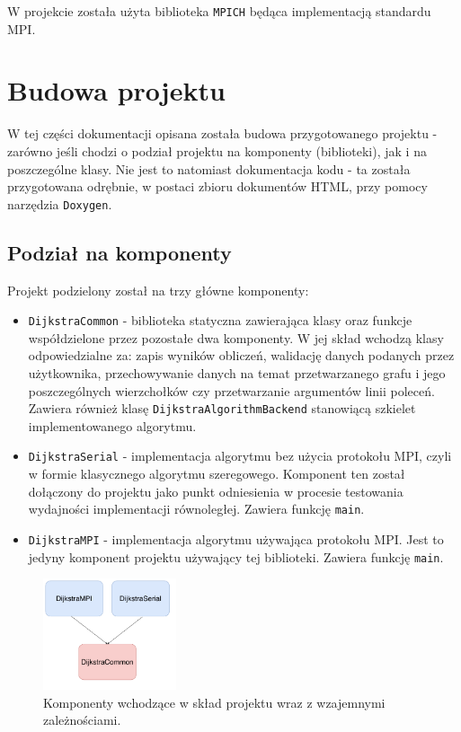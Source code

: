\documentclass[12pt]{article}
\begin{document}
W projekcie została użyta biblioteka \lstinline|MPICH| będąca implementacją standardu MPI.

\newpage
\section{Budowa projektu}
W tej części dokumentacji opisana została budowa przygotowanego projektu - zarówno jeśli chodzi o podział projektu na komponenty (biblioteki), jak i na poszczególne klasy. Nie jest to natomiast dokumentacja kodu - ta została przygotowana odrębnie, w postaci zbioru dokumentów HTML, przy pomocy narzędzia \lstinline{Doxygen}.

\subsection{Podział na komponenty}
Projekt podzielony został na trzy główne komponenty:
\begin{itemize}
\item \lstinline{DijkstraCommon} - biblioteka statyczna zawierająca klasy oraz funkcje współdzielone przez pozostałe dwa komponenty. W jej skład wchodzą klasy odpowiedzialne za: zapis wyników obliczeń, walidację danych podanych przez użytkownika, przechowywanie danych na temat przetwarzanego grafu i jego poszczególnych wierzchołków czy przetwarzanie argumentów linii poleceń. Zawiera również klasę \lstinline{DijkstraAlgorithmBackend} stanowiącą szkielet implementowanego algorytmu.
\item \lstinline{DijkstraSerial} - implementacja algorytmu bez użycia protokołu MPI, czyli w formie klasycznego algorytmu szeregowego. Komponent ten został dołączony do projektu jako punkt odniesienia w procesie testowania wydajności implementacji równoległej. Zawiera funkcję \lstinline{main}.
\item \lstinline{DijkstraMPI} - implementacja algorytmu używająca protokołu MPI. Jest to jedyny komponent projektu używający tej biblioteki. Zawiera funkcję \lstinline{main}.
\end{itemize}
\begin{figure}[H]
\centering
\includegraphics[width=0.35\textwidth]{static/DijkstraArch1.pdf}
\caption{Komponenty wchodzące w skład projektu wraz z wzajemnymi zależnościami.}
\label{fig:arch1}
\end{figure}
\end{document}
